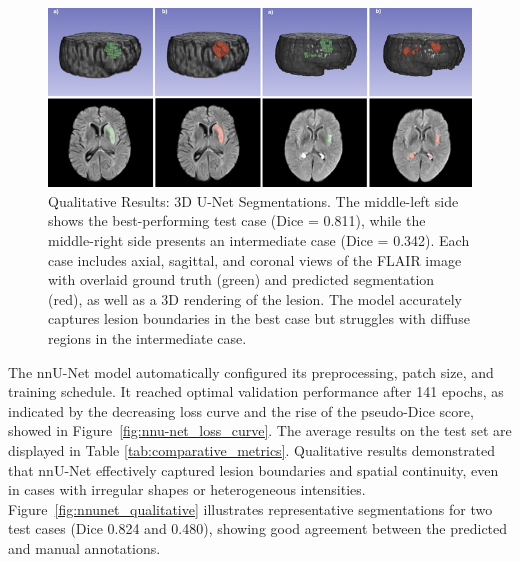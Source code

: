 \documentclass[12pt]{article}
\begin{document}
\begin{figure}[tp]
    \centering
    \includegraphics[width=\textwidth]{figures/Figure 2.jpg}
    \caption{Qualitative Results: 3D U-Net Segmentations. The middle-left side shows the best-performing test case (Dice = 0.811), while the middle-right side presents an intermediate case (Dice = 0.342). Each case includes axial, sagittal, and coronal views of the FLAIR image with overlaid ground truth (green) and predicted segmentation (red), as well as a 3D rendering of the lesion. The model accurately captures lesion boundaries in the best case but struggles with diffuse regions in the intermediate case.}
    \label{fig:unet_qualitative}
\end{figure}



%
The nnU-Net model automatically configured its preprocessing, patch size, and training schedule. It reached optimal validation performance after 141 epochs, as indicated by the decreasing loss curve and the rise of the pseudo-Dice score, showed in Figure~\ref{fig:nnu-net_loss_curve}. The average results on the test set are displayed in Table \ref{tab:comparative_metrics}.
%
Qualitative results demonstrated that nnU-Net effectively captured lesion boundaries and spatial continuity, even in cases with irregular shapes or heterogeneous intensities. Figure~\ref{fig:nnunet_qualitative} illustrates representative segmentations for two test cases (Dice 0.824 and 0.480), showing good agreement between the predicted and manual annotations.
\end{document}
